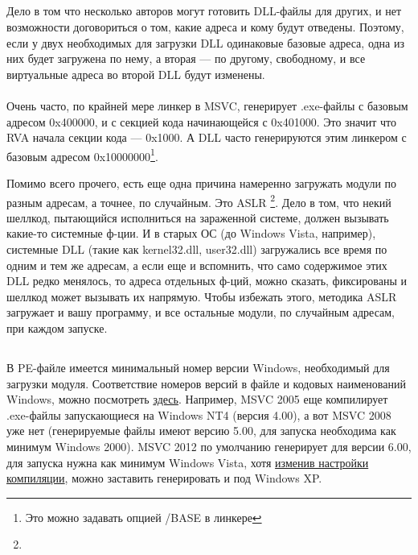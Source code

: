 \subsection{}
Дело в том что несколько авторов могут готовить DLL-файлы для других, и нет возможности договориться о том, какие адреса и кому будут отведены.
Поэтому, если у двух необходимых для загрузки DLL одинаковые базовые адреса, одна из них будет загружена по нему, а вторая --- по другому, свободному, и все виртуальные адреса во второй DLL будут изменены. \\
\\
Очень часто, по крайней мере линкер в \ac{MSVC}, генерирует .exe-файлы с базовым адресом 0x400000, и с секцией кода начинающейся с 0x401000. Это значит что \ac{RVA} начала секции кода --- 0x1000. 
А DLL часто генерируются этим линкером с базовым адресом 0x10000000\footnote{Это можно задавать опцией /BASE в линкере}.

Помимо всего прочего, есть еще одна причина намеренно загружать модули по разным адресам, а точнее, по случайным. 
Это \ac{ASLR}
\footnote{}.
Дело в том, что некий шеллкод, пытающийся исполниться на зараженной системе, должен вызывать какие-то системные ф-ции. И в старых \ac{ОС} (до Windows Vista, например), системные DLL (такие как kernel32.dll, user32.dll) загружались все время
по одним и тем же адресам, а если еще и вспомнить, что само содержимое этих DLL редко менялось, то адреса отдельных
ф-ций, можно сказать, фиксированы и шеллкод может вызывать их напрямую. Чтобы избежать этого, методика \ac{ASLR} загружает
и вашу программу, и все остальные модули, по случайным адресам, при каждом запуске.

\subsection{}

В PE-файле имеется минимальный номер версии Windows, необходимый для загрузки модуля. 
Соответствие номеров версий в файле и кодовых наименований Windows, можно посмотреть 
\href{https://en.wikipedia.org/wiki/Windows_NT#Releases}{здесь}.
Например, \ac{MSVC} 2005 еще компилирует .exe-файлы запускающиеся на Windows NT4 (версия 4.00),
а вот \ac{MSVC} 2008 уже нет (генерируемые файлы имеют версию 5.00, для запуска необходима как минимум Windows 2000).
\ac{MSVC} 2012 по умолчанию генерирует для версии 6.00, для запуска нужна как минимум Windows Vista, хотя 
\href{http://blogs.msdn.com/b/vcblog/archive/2012/10/08/10357555.aspx}{изменив настройки компиляции}, 
можно заставить генерировать и под Windows XP.

